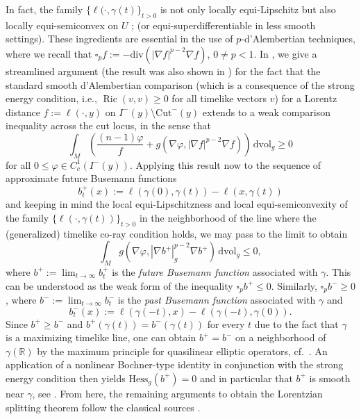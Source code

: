 \documentclass[a4paper,11pt]{article}
\numberwithin{equation}{section}
\theoremstyle{definition}
\theoremstyle{plain}
\newcommand{\R}{\mathbb R}
\DeclareMathOperator{\Ric}{Ric}
\let\phi\varphi
\begin{document}
In fact, the family $\{\ell(\cdot,\gamma(t)\}_{t > 0}$ is not only locally equi-Lipschitz but also locally equi-semiconvex on $U$ \cite[Prop.\ 5]{Quintetsmooth}; (or equi-superdifferentiable \cite[Prop.\ 13]{quintetnonsmooth} in less smooth settings). These ingredients are essential in the use of $p$-d'Alembertian techniques, where we recall that $\square_p f:=-\mathrm{div}( |\nabla f|^{p-2}\nabla f)$, $0 \neq p < 1$. In \cite{Quintetsmooth}, we give a streamlined argument (the result was also shown in \cite{octet}) for the fact that the standard smooth d'Alembertian comparison (which is a consequence of the strong energy condition, i.e., $\Ric(v,v) \geq 0$ for all timelike vectors $v$) for a Lorentz distance $f:=\ell(\cdot,y)$ on $I^-(y) \setminus \mathrm{Cut}^-(y)$ extends to a weak comparison inequality across the cut locus, in the sense that
\begin{equation}
    \int_M \left( \frac{(n-1)\phi}{f} + g(\nabla \phi, |\nabla f|^{p-2} \nabla f) \right) \, \mathrm{dvol}_g\geq 0
\end{equation}
for all $0 \leq \phi \in C^1_c(I^-(y))$. Applying this result now to the sequence of approximate future Busemann functions
\begin{equation}
    b_t^+(x):=\ell(\gamma(0),\gamma(t)) - \ell(x,\gamma(t))
\end{equation}
and keeping in mind the local equi-Lipschitzness and local equi-semiconvexity of the family $\{\ell(\cdot,\gamma(t))\}_{t > 0}$ in the neighborhood of the line where the (generalized) timelike co-ray condition holds, we may pass to the limit to obtain
\begin{equation}
    \int_M g(\nabla \phi, |\nabla b^+|_g^{p-2} \nabla b^+) \,  \mathrm{dvol}_g \leq 0,
\end{equation}
where $b^+:=\lim_{t \to \infty} b_t^+$ is the \emph{future Busemann function} associated with $\gamma$. This can be understood as the weak form of the inequality $\square_p b^+ \leq 0$. Similarly, $\square_p b^- \geq 0$, where $b^-:=\lim_{t \to \infty} b_t^-$ is the \emph{past Busemann function} associated with $\gamma$ and
\begin{equation}
    b_t^-(x):=\ell(\gamma(-t),x) - \ell(\gamma(-t),\gamma(0)).
\end{equation}
Since $b^+ \geq b^-$ and $b^+(\gamma(t)) = b^-(\gamma(t))$ for every $t$ due to the fact that $\gamma$ is a maximizing timelike line, one can obtain $b^+ = b^-$ on a neighborhood of $\gamma(\R)$ by the maximum principle for quasilinear elliptic operators, cf.\ \cite[Prop.\ 9]{Quintetsmooth}. An application of a nonlinear Bochner-type identity in conjunction with the strong energy condition then yields $\mathrm{Hess}_g(b^+) = 0$ and in particular that $b^+$ is smooth near $\gamma$, see \cite[Cor.\ 14]{Quintetsmooth}. From here, the remaining arguments to obtain the Lorentzian splitting theorem follow the classical sources \cite{Eschenburg1988, Galloway1989, Newman1990, GallowayHorta}.
\end{document}
